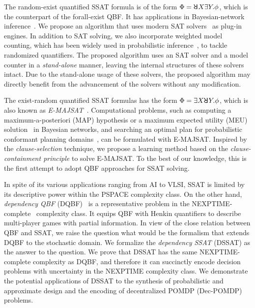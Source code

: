 The random-exist quantified SSAT formula is of the form $\Phi=\random{} X \exists Y.\phi$, which is the counterpart of the forall-exist QBF.
It has applications in Bayesian-network inference~\cite{Cooper1990,Bacchus2003}.
We propose an algorithm that uses modern SAT solvers~\cite{Een2003Solver,Een2003Incremental} as plug-in engines.
In addition to SAT solving, we also incorporate weighted model counting, which has been widely used in probabilistic inference~\cite{Sang2005BayesianInference,Chavira2008}, to tackle randomized quantifiers.
The proposed algorithm uses an SAT solver and a model counter in a \textit{stand-alone} manner, leaving the internal structures of these solvers intact.
Due to the stand-alone usage of these solvers, the proposed algorithm may directly benefit from the advancement of the solvers without any modification.

The exist-random quantified SSAT formulas has the form $\Phi=\exists X \random{} Y.\phi$,
which is also known as \textit{E-MAJSAT}~\cite{Littman1998}.
Computational problems, such as computing a maximum-a-posteriori (MAP) hypothesis or a maximum expected utility (MEU) solution~\cite{Dechter1998} in Bayesian networks,
and searching an optimal plan for probabilistic conformant planning domains~\cite{Littman1998},
can be formulated with E-MAJSAT.
Inspired by the \textit{clause-selection} technique,
we propose a learning method based on the \textit{clause-containment principle} to solve E-MAJSAT.
To the best of our knowledge, this is the first attempt to adopt QBF approaches for SSAT solving.

In spite of its various applications ranging from AI to VLSI,
SSAT is limited by its descriptive power within the PSPACE complexity class.
On the other hand, \textit{dependency QBF} (DQBF)~\cite{Balabanov2014,Scholl2018} is a representative problem in the NEXPTIME-complete~\cite{Peterson2001} complexity class.
It equips QBF with Henkin quantifiers to describe multi-player games with partial information.
In view of the close relation between QBF and SSAT,
we raise the question what would be the formalism that extends DQBF to the stochastic domain.
We formalize the \emph{dependency SSAT} (DSSAT) as the answer to the question.
We prove that DSSAT has the same NEXPTIME-complete complexity as DQBF,
and therefore it can succinctly encode decision problems with uncertainty in the NEXPTIME complexity class.
We demonstrate the potential applications of DSSAT to the synthesis of probabilistic and approximate design and the encoding of decentralized POMDP (Dec-POMDP)~\cite{Oliehoek2016} problems.

